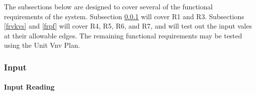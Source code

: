 \documentclass[12pt, titlepage]{article}
\begin{document}
\label{testfr}

The subsections below are designed to cover several of the functional requirements of the system. Subsection \ref{frinput} will cover R1 and R3. Subsections \ref{frvkvs} and \ref{frpf} will cover R4, R5, R6, and R7, and will test out the input vales at their allowable edges. The remaining functional requirements may be tested using the Unit Vnv Plan.

\subsubsection{Input}
\label{frinput}
		
\paragraph{Input Reading}
\end{document}
